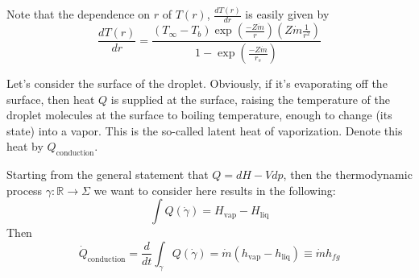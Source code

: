 \documentclass[10pt]{amsart}
\begin{document}
\begin{multicols*}{2}
Note that the dependence on $r$ of $T(r)$, $\frac{dT(r)}{dr}$ is easily given by
\begin{equation}\label{Eq:dTdrdroplet}
\frac{dT(r)}{dr} = \frac{ (T_{\infty} -T_b) \exp{ \left( \frac{ -Z\dot{m}}{r} \right) } \left( Z\dot{m} \frac{1}{r^2} \right) }{ 1 - \exp{ \left( \frac{-Z\dot{m}}{r_s} \right) } }
\end{equation}

Let's consider the surface of the droplet.  Obviously, if it's evaporating off the surface, then heat $Q$ is supplied at the surface, raising the temperature of the droplet molecules at the surface to boiling temperature, enough to change (its state) into a vapor.  This is the so-called latent heat of vaporization.  Denote this heat by $Q_{\text{conduction}}$.  

Starting from the general statement that $Q = dH - Vdp$, then the thermodynamic process $\gamma:\mathbb{R} \to \Sigma$ we want to consider here results in the following:
\[
\int Q(\dot{\gamma}) = H_{\text{vap}} - H_{\text{liq}}
\]
Then 
\begin{equation}\label{Eq:dropletsurfaceenthalpychange}
\dot{Q}_{\text{conduction}} = \frac{d}{dt} \int_{\gamma} Q(\dot{\gamma}) = \dot{m}(h_{\text{vap}} -h_{\text{liq}}) \equiv \dot{m}h_{fg} 
\end{equation}


\end{multicols*}
\end{document}
